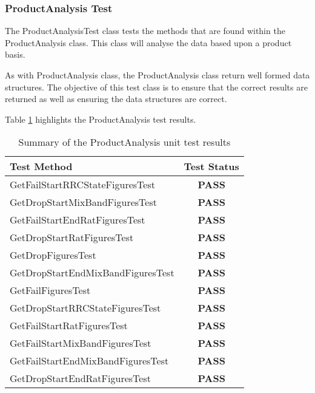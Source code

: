 \subsubsection{ProductAnalysis Test}

The {\ttfamily ProductAnalysisTest} class tests the methods that are found 
within the ProductAnalysis class. This class will analyse the data based upon a 
product basis.

As with {\ttfamily ProductAnalysis} class, the {\ttfamily ProductAnalysis} 
class return well formed data structures. The objective of this test class is 
to ensure that the correct results are returned as well as ensuring the data 
structures are correct.

Table \ref{tab:product_analysis_test} highlights the ProductAnalysis test 
results.

\begin{table}[h]
  \centering
  \begin{tabular}{|l|c|}
    \hline
    {\bfseries Test Method}           & {\bfseries Test Status} \\ 
    \hline
    GetFailStartRRCStateFiguresTest   & {\bfseries \color{OliveGreen} PASS} \\ 
    GetDropStartMixBandFiguresTest    & {\bfseries \color{OliveGreen} PASS} \\ 
    GetFailStartEndRatFiguresTest     & {\bfseries \color{OliveGreen} PASS} \\ 
    GetDropStartRatFiguresTest        & {\bfseries \color{OliveGreen} PASS} \\ 
    GetDropFiguresTest                & {\bfseries \color{OliveGreen} PASS} \\ 
    GetDropStartEndMixBandFiguresTest & {\bfseries \color{OliveGreen} PASS} \\ 
    GetFailFiguresTest                & {\bfseries \color{OliveGreen} PASS} \\ 
    GetDropStartRRCStateFiguresTest   & {\bfseries \color{OliveGreen} PASS} \\ 
    GetFailStartRatFiguresTest        & {\bfseries \color{OliveGreen} PASS} \\ 
    GetFailStartMixBandFiguresTest    & {\bfseries \color{OliveGreen} PASS} \\ 
    GetFailStartEndMixBandFiguresTest & {\bfseries \color{OliveGreen} PASS} \\ 
    GetDropStartEndRatFiguresTest     & {\bfseries \color{OliveGreen} PASS} \\
    \hline
  \end{tabular}
  \caption[Summary of the ProductAnalysis unit test results]
          {Summary of the ProductAnalysis unit test results}
  \label{tab:product_analysis_test}
\end{table}



